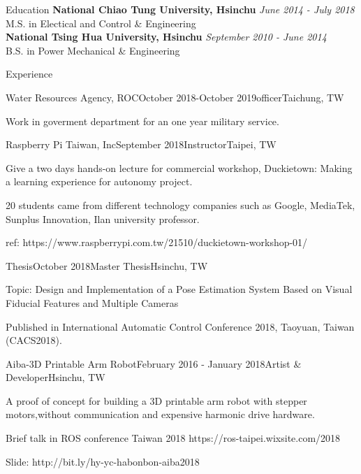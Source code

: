 \documentclass{resume}
\begin{document}
  \begin{rSection}{Education}
    {\bf National Chiao Tung University, Hsinchu} \hfill {\em June 2014 - July 2018} \\ 
    { M.S. in Electical and Control \& Engineering } \\

    {\bf National Tsing Hua University, Hsinchu} \hfill {\em September 2010 - June 2014} \\ 
    { B.S. in Power Mechanical \& Engineering } \\
  \end{rSection}
  
  \begin{rSection}{Experience}
  
    \begin{rSubsection}{Water Resources Agency, ROC}{October 2018-October 2019}{officer}{Taichung, TW}
    \item Work in goverment department for an one year military service. 
    \end{rSubsection}
	  
    \begin{rSubsection}{Raspberry Pi Taiwan, Inc}{September 2018}{Instructor}{Taipei, TW}
    \item Give a two days hands-on lecture for commercial workshop, Duckietown: Making a learning experience for autonomy project.
    \item 20 students came from different technology companies such as Google, MediaTek, Sunplus Innovation, Ilan university professor.
    \item ref: https://www.raspberrypi.com.tw/21510/duckietown-workshop-01/
    \end{rSubsection}
  
    \begin{rSubsection}{Thesis}{October 2018}{Master Thesis}{Hsinchu, TW}
    \item Topic:  Design and Implementation of a Pose Estimation System Based on Visual Fiducial Features and Multiple Cameras 	    
    \item Published in International Automatic Control Conference 2018, Taoyuan, Taiwan (CACS2018).
    \end{rSubsection}

    \begin{rSubsection}{Aiba-3D Printable Arm Robot}{February 2016 - January 2018}{Artist \& Developer}{Hsinchu, TW}
    \item A proof of concept for building a 3D printable arm robot with stepper motors,without communication and expensive harmonic drive hardware.
    \item Brief talk in ROS conference Taiwan 2018  https://ros-taipei.wixsite.com/2018
    \item Slide: http://bit.ly/hy-yc-habonbon-aiba2018
    \end{rSubsection}
  
  \end{rSection}
  
\end{document}
